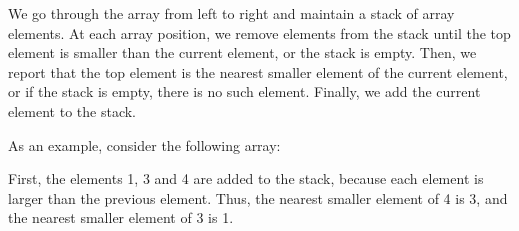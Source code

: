 We go through the array from left to right
and maintain a stack of array elements.
At each array position, we remove elements from the stack
until the top element is smaller than the
current element, or the stack is empty.
Then, we report that the top element is
the nearest smaller element of the current element,
or if the stack is empty, there is no such element.
Finally, we add the current element to the stack.

As an example, consider the following array:
\begin{center}
\end{center}

First, the elements 1, 3 and 4 are added to the stack,
because each element is larger than the previous element.
Thus, the nearest smaller element of 4 is 3,
and the nearest smaller element of 3 is 1.
\begin{center}
\end{center}

